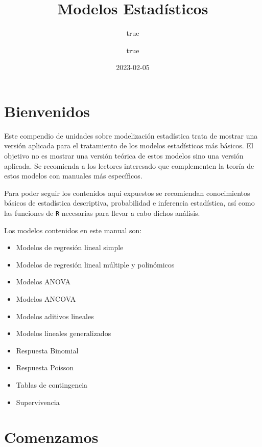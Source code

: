 \documentclass[
]{book}
\title{Modelos Estadísticos}
\author{true \and true}
\date{2023-02-05}
\providecommand{\tightlist}{%
  \setlength{\itemsep}{0pt}\setlength{\parskip}{0pt}}
\begin{document}
\maketitle

{
\setcounter{tocdepth}{1}
\tableofcontents
}
\hypertarget{bienvenidos}{%
\chapter*{Bienvenidos}\label{bienvenidos}}

Este compendio de unidades sobre modelización estadística trata de mostrar una versión aplicada para el tratamiento de los modelos estadísticos más básicos. El objetivo no es mostrar una versión teórica de estos modelos sino una versión aplicada. Se recomienda a los lectores interesado que complementen la teoría de estos modelos con manuales más específicos.

Para poder seguir los contenidos aquí expuestos se recomiendan conocimientos básicos de estadística descriptiva, probabilidad e inferencia estadística, así como las funciones de \texttt{R} necesarias para llevar a cabo dichos análisis.

Los modelos contenidos en este manual son:

\begin{itemize}
\tightlist
\item
  Modelos de regresión lineal simple
\item
  Modelos de regresión lineal múltiple y polinómicos
\item
  Modelos ANOVA
\item
  Modelos ANCOVA
\item
  Modelos aditivos lineales
\item
  Modelos lineales generalizados
\item
  Respuesta Binomial
\item
  Respuesta Poisson
\item
  Tablas de contingencia
\item
  Supervivencia
\end{itemize}

\hypertarget{introlibro}{%
\chapter{Comenzamos}\label{introlibro}}
\end{document}
